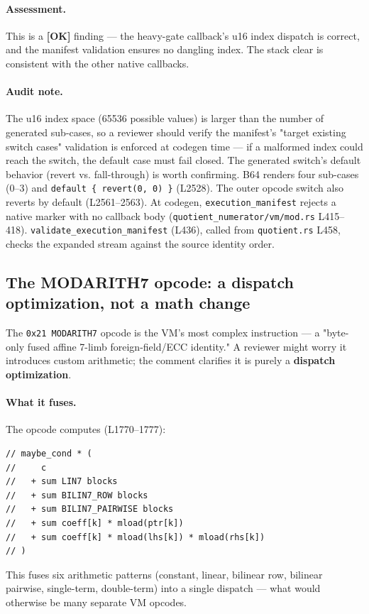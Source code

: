 \paragraph{Assessment.} This is a
\textcolor{tracegreen}{\textbf{[OK]}} finding --- the heavy-gate
callback's u16 index dispatch is correct, and the manifest
validation ensures no dangling index. The stack clear is
consistent with the other native callbacks.

\paragraph{Audit note.} The u16 index space (65536 possible
values) is larger than the number of generated sub-cases, so a
reviewer should verify the manifest's "target existing switch
cases" validation is enforced at codegen time --- if a malformed
index could reach the switch, the default case must fail closed.
The generated switch's default behavior (revert vs. fall-through)
is worth confirming.  B64 renders four sub-cases
(0--3) and \texttt{default \{ revert(0, 0) \}} (L2528). The outer
opcode switch also reverts by default (L2561--2563). At codegen,
\texttt{execution\_\allowbreak{}manifest} rejects a native marker with no
callback body (\texttt{quotient\_\allowbreak{}numerator/\allowbreak{}vm/\allowbreak{}mod.rs} L415--418).
\texttt{validate\_\allowbreak{}execution\_\allowbreak{}manifest} (L436), called from
\texttt{quotient.rs} L458, checks the expanded stream against the
source identity order.

\subsection{The MODARITH7 opcode: a dispatch optimization, not a math change}
\label{sec:pr-modarith7}

The \texttt{0x21 MODARITH7} opcode is the VM's most complex
instruction --- a "byte-only fused affine 7-limb foreign-field/ECC
identity." A reviewer might worry it introduces custom arithmetic;
the comment clarifies it is purely a \textbf{dispatch
optimization}.

\paragraph{What it fuses.} The opcode computes (L1770--1777):
\begin{lstlisting}[style=yul]
// maybe_cond * (
//     c
//   + sum LIN7 blocks
//   + sum BILIN7_ROW blocks
//   + sum BILIN7_PAIRWISE blocks
//   + sum coeff[k] * mload(ptr[k])
//   + sum coeff[k] * mload(lhs[k]) * mload(rhs[k])
// )
\end{lstlisting}
This fuses six arithmetic patterns (constant, linear, bilinear
row, bilinear pairwise, single-term, double-term) into a single
dispatch --- what would otherwise be many separate VM opcodes.

